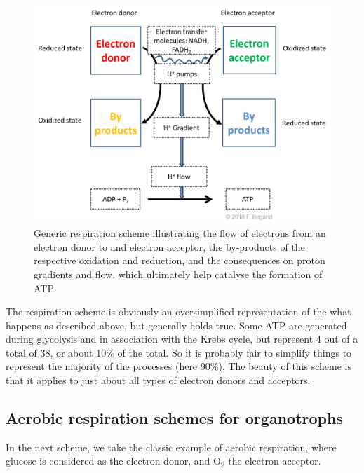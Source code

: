 \documentclass[]{book}
\theoremstyle{definition}
\theoremstyle{definition}
\theoremstyle{definition}
\theoremstyle{remark}
\begin{document}
\begin{figure}

{\centering \includegraphics[width=0.75\linewidth]{pictures/respiration-generic} 

}

\caption{Generic respiration scheme illustrating the flow of electrons from an electron donor to and electron acceptor, the by-products of the respective oxidation and reduction, and the consequences on proton gradients and flow, which ultimately help catalyse the formation of ATP}\label{fig:generic-resp-scheme}
\end{figure}

The respiration scheme is obviously an oversimplified representation of
the what happens as described above, but generally holds true. Some ATP
are generated during glycolysis and in association with the Krebs cycle,
but represent 4 out of a total of 38, or about 10\% of the total. So it
is probably fair to simplify things to represent the majority of the
processes (here 90\%). The beauty of this scheme is that it applies to
just about all types of electron donors and acceptors.

\subsection{Aerobic respiration schemes for
organotrophs}\label{aerobic-respiration-schemes-for-organotrophs}

In the next scheme, we take the classic example of aerobic respiration,
where glucose is considered as the electron donor, and
O\textsubscript{2} the electron acceptor.
\end{document}
